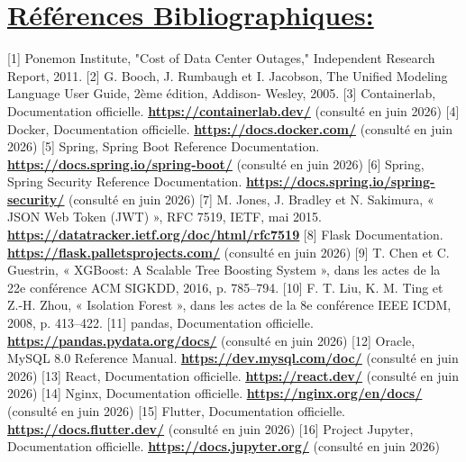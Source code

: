 \documentclass[12pt,a4paper]{report}
\newcommand{\ub}[1]{\uline{\textbf{#1}}}
\begin{document}
\section*{\ub{Références Bibliographiques:}}
[1] Ponemon Institute, "Cost of Data Center Outages," Independent Research Report, 2011. [2] G. Booch, J. Rumbaugh et I. Jacobson, The Unified Modeling Language User Guide, 2ème édition, Addison- Wesley, 2005. [3] Containerlab, Documentation officielle. \ub{\url{https://containerlab.dev/}} (consulté en juin 2026) [4] Docker, Documentation officielle. \ub{\url{https://docs.docker.com/}} (consulté en juin 2026) [5] Spring, Spring Boot Reference Documentation. \ub{\url{https://docs.spring.io/spring-boot/}} (consulté en juin 2026) [6] Spring, Spring Security Reference Documentation. \ub{\url{https://docs.spring.io/spring-security/}} (consulté en juin 2026) [7] M. Jones, J. Bradley et N. Sakimura, « JSON Web Token (JWT) », RFC 7519, IETF, mai 2015. \ub{\url{https://datatracker.ietf.org/doc/html/rfc7519}} [8] Flask Documentation. \ub{\url{https://flask.palletsprojects.com/}} (consulté en juin 2026) [9] T. Chen et C. Guestrin, « XGBoost: A Scalable Tree Boosting System », dans les actes de la 22e conférence ACM SIGKDD, 2016, p. 785–794. [10] F. T. Liu, K. M. Ting et Z.-H. Zhou, « Isolation Forest », dans les actes de la 8e conférence IEEE ICDM, 2008, p. 413–422. [11] pandas, Documentation officielle. \ub{\url{https://pandas.pydata.org/docs/}} (consulté en juin 2026) [12] Oracle, MySQL 8.0 Reference Manual. \ub{\url{https://dev.mysql.com/doc/}} (consulté en juin 2026) [13] React, Documentation officielle. \ub{\url{https://react.dev/}} (consulté en juin 2026) [14] Nginx, Documentation officielle. \ub{\url{https://nginx.org/en/docs/}} (consulté en juin 2026) [15] Flutter, Documentation officielle. \ub{\url{https://docs.flutter.dev/}} (consulté en juin 2026) [16] Project Jupyter, Documentation officielle. \ub{\url{https://docs.jupyter.org/}} (consulté en juin 2026)\par
\end{document}
